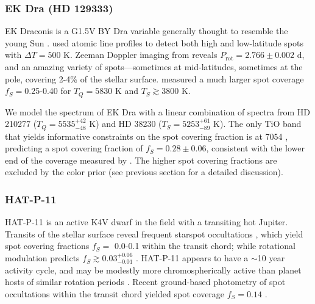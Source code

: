 \subsubsection{EK Dra (HD 129333)}


EK Draconis is a G1.5V BY Dra variable generally thought to resemble the young Sun \citep{Montes2001}. \citet{Jarvinen2007} used atomic line profiles to detect both high and low-latitude spots with $\Delta T = 500$ K. Zeeman Doppler imaging from \citet{Waite2017} reveals $P_\mathrm{rot} = 2.766 \pm 0.002$ d, and an amazing variety of spots---sometimes at mid-latitudes, sometimes at the pole, covering 2-4\% of the stellar surface. \citet{ONeal2004} measured a much larger spot coverage $f_S = $0.25-0.40 for $T_Q = 5830$ K and $T_S \gtrsim 3800$ K. 

We model the spectrum of EK Dra with a linear combination of spectra from HD 210277 ($T_Q = 5535^{+42}_{-48}$ K) and HD 38230 ($T_S = 5253^{+61}_{-89}$ K). The only TiO band that yields informative constraints on the spot covering fraction is at 7054 \angstrom, predicting a spot covering fraction of $f_S = 0.28 \pm 0.06$, consistent with the lower end of the coverage measured by \citet{ONeal2004}. The higher spot covering fractions are excluded by the color prior (see previous section for a detailed discussion).

\subsubsection{HAT-P-11}

HAT-P-11 is an active K4V dwarf in the \kepler field with a transiting hot Jupiter. Transits of the stellar surface reveal frequent starspot occultations \citep{Deming2011,Sanchis-Ojeda2011}, which yield spot covering fractions $f_S =$ 0.0-0.1 within the transit chord; while rotational modulation predicts $f_S \gtrsim 0.03^{+0.06}_{-0.01}$ \citep{Morris2017a}. HAT-P-11 appears to have a $\sim$10 year activity cycle, and may be modestly more chromospherically active than planet hosts of similar rotation periods \citep{Morris2018b}. Recent ground-based photometry of spot occultations within the transit chord yielded spot coverage $f_S = 0.14$ \citep{Morris2018d}. 


